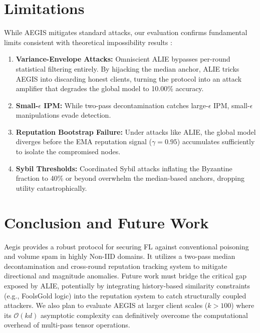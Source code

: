 \documentclass[10pt, conference]{IEEEtran}
\begin{document}
\section{Limitations}
While AEGIS mitigates standard attacks, our evaluation confirms fundamental limits consistent with theoretical impossibility results \cite{baruch2019}:
\begin{enumerate}
    \item \textbf{Variance-Envelope Attacks:} Omniscient ALIE bypasses per-round statistical filtering entirely. By hijacking the median anchor, ALIE tricks AEGIS into discarding honest clients, turning the protocol into an attack amplifier that degrades the global model to 10.00\% accuracy.
    \item \textbf{Small-$\epsilon$ IPM:} While two-pass decontamination catches large-$\epsilon$ IPM, small-$\epsilon$ manipulations evade detection.
    \item \textbf{Reputation Bootstrap Failure:} Under attacks like ALIE, the global model diverges before the EMA reputation signal ($\gamma=0.95$) accumulates sufficiently to isolate the compromised nodes.
    \item \textbf{Sybil Thresholds:} Coordinated Sybil attacks inflating the Byzantine fraction to 40\% or beyond overwhelm the median-based anchors, dropping utility catastrophically.
\end{enumerate}

\section{Conclusion and Future Work}
Aegis provides a robust protocol for securing FL against conventional poisoning and volume spam in highly Non-IID domains. It utilizes a two-pass median decontamination and cross-round reputation tracking system to mitigate directional and magnitude anomalies. Future work must bridge the critical gap exposed by ALIE, potentially by integrating history-based similarity constraints (e.g., FoolsGold logic) into the reputation system to catch structurally coupled attackers. We also plan to evaluate AEGIS at larger client scales ($k > 100$) where its $\mathcal{O}(kd)$ asymptotic complexity can definitively overcome the computational overhead of multi-pass tensor operations.
\end{document}

